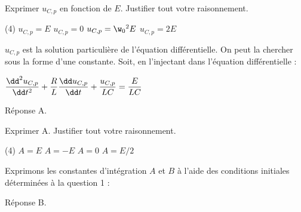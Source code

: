 \documentclass[a4paper, 12pt, final, garamond]{book}
\begin{document}
\QR
{Exprimer $u_{C,p}$ en fonction de $E$. Justifier tout votre raisonnement.

\begin{tasks}[label=\protect\fbox{\Alph*}, label-width=4ex](4)
	\task $u_{C,p}=E$
	\task $u_{C,p}=0$
	\task $u_{C,p}=\w_0{}^2 E$
	\task $u_{C,p}=2E$
\end{tasks}
}
{
$u_{C,p}$ est la solution particulière de l’équation différentielle.
On peut la chercher sous la forme d’une constante. Soit, en l’injectant dans l’équation différentielle :

$\f{\dd^2u_{C,p}}{\dd t^2}+\f{R}{L}\f{\dd u_{C,p}}{\dd t}+\f{u_{C,p}}{LC}=\f{E}{LC}$


\medskip

\noindent
Réponse A.
}

\QR
{Exprimer A. Justifier tout votre raisonnement.
	\begin{tasks}[label=\protect\fbox{\Alph*}, label-width=4ex](4)
		\task $A=E$
		\task $A=-E$
		\task $A=0$
		\task $A=E/2$
	\end{tasks}
}
{
	Exprimons les constantes d’intégration $A$ et $B$ à l’aide des conditions initiales déterminées à la question 1 :



	\medskip

	\noindent
	Réponse B.
}
\end{document}
